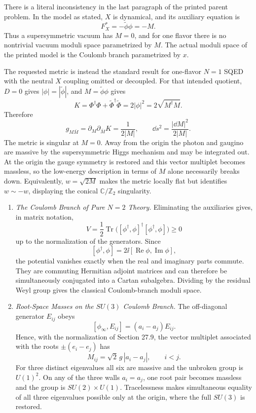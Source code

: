 \begin{enumerate}
  There is a literal inconsistency in the last paragraph of the printed
  parent problem.  In the model as stated, \(X\) is dynamical, and its
  auxiliary equation is
  \[
    F_X^*=-\widetilde\phi\phi=-M.
  \]
  Thus a supersymmetric vacuum has \(M=0\), and for one flavor there is no
  nontrivial vacuum moduli space parametrized by \(M\).  The actual moduli
  space of the printed model is the Coulomb branch parametrized by \(x\).

  The requested metric is instead the standard result for one-flavor
  \(N=1\) SQED with the neutral \(X\) coupling omitted or decoupled.  For
  that intended quotient, \(D=0\) gives
  \(|\phi|=|\widetilde\phi|\), and
  \(M=\widetilde\phi\phi\) gives
  \[
    K=\Phi^\dagger\Phi+
       \widetilde\Phi^\dagger\widetilde\Phi
      =2|\phi|^2
      =2\sqrt{M^\dagger M}.
  \]
  Therefore
  \[
    g_{M\bar M}=\partial_M\partial_{\bar M}K
      =\frac1{2|M|},
    \qquad
    \dd s^2=\frac{|\dd M|^2}{2|M|}.
  \]
  The metric is singular at \(M=0\).  Away from the origin the photon and
  gaugino are massive by the supersymmetric Higgs mechanism and may be
  integrated out.  At the origin the gauge symmetry is restored and this
  vector multiplet becomes massless, so the low-energy description in
  terms of \(M\) alone necessarily breaks down.  Equivalently,
  \(w=\sqrt{2M}\) makes the metric locally flat but identifies
  \(w\sim-w\), displaying the conical \(\mathbb C/\mathbb Z_2\)
  singularity.

  \begin{enumerate}
    \item \emph{The Coulomb Branch of Pure \(N=2\) Theory.}
    Eliminating the auxiliaries gives, in matrix notation,
      \[
        V=\frac12\operatorname{Tr}
           \bigl([\phi^\dagger,\phi]^\dagger[\phi^\dagger,\phi]\bigr)
          \ge0
      \]
      up to the normalization of the generators.  Since
      \[
        [\phi^\dagger,\phi]
           =2\ii[\operatorname{Re}\phi,\operatorname{Im}\phi],
      \]
      the potential vanishes exactly when the real and imaginary parts
      commute.  They are commuting Hermitian adjoint matrices and can therefore
      be simultaneously conjugated into a Cartan subalgebra.  Dividing by the
      residual Weyl group gives the classical Coulomb-branch moduli space.
    \item \emph{Root-Space Masses on the \(SU(3)\) Coulomb Branch.}
    The off-diagonal generator \(E_{ij}\) obeys
      \[
        [\phi_\infty,E_{ij}]=(a_i-a_j)E_{ij}.
      \]
      Hence, with the normalization of Section 27.9, the vector multiplet
      associated with the roots \(\pm(e_i-e_j)\) has
      \[
        M_{ij}=\sqrt2\,g\,|a_i-a_j|,\qquad i<j.
      \]
      For three distinct eigenvalues all six are massive and the unbroken
      group is \(U(1)^2\).  On any of the three walls \(a_i=a_j\), one root
      pair becomes massless and the group is \(SU(2)\times U(1)\).  Tracelessness
      makes simultaneous equality of all three eigenvalues possible only at
      the origin, where the full \(SU(3)\) is restored.
  \end{enumerate}


\end{enumerate}
